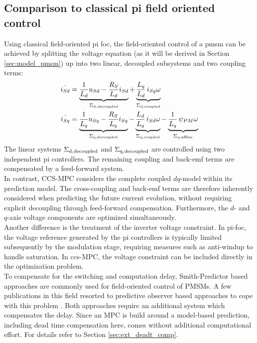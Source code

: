 \subsection{Comparison to classical \acrshort{pi} field oriented control \label{sec:intro_comp_cs}}
Using classical field-oriented \acrshort{pi} \acrshort{foc}, the field-oriented control of a \acrshort{pmsm} can be achieved by splitting the voltage equation (as it will be derived in Section \ref{sec:model_pmsm}) up into two linear, decoupled subsystems and two coupling terms:
\begin{align*}
	\Dot{i_{Sd}}
	&=
	\underbrace{
		\frac{1}{L_d} u_{Sd} - \frac{R_S}{L_d} i_{Sd}
	}_{\Sigma_{\mathrm{d,decoupled}}}
	+
	\underbrace{
		\frac{L_q}{L_d} \, i_{Sq}  \omega 
	}_{\Sigma_{\mathrm{d,coupled}}}
	\\
	\Dot{i_{Sq}}
	&=
	\underbrace{
		\frac{1}{L_q} u_{Sq} - \frac{R_S}{L_q} i_{Sq}
	}_{\Sigma_{\mathrm{q,decoupled}}}
	-
	\underbrace{
		\frac{L_d}{L_q} \,  i_{Sd} \omega
	}_{\Sigma_{\mathrm{q,coupled}}}
	-
	\underbrace{
		\frac{1}{L_q} \, \psi_{PM} \omega 
	}_{\Sigma_{\mathrm{q,affine}}}
\end{align*}
The linear systems $\Sigma_{\mathrm{d,decoupled}}$ and $\Sigma_{\mathrm{q,decoupled}}$ are controlled using two independent \acrshort{pi} controllers. The remaining coupling and back-\acrshort{emf} terms are compensated by a feed-forward system.\\
In contrast, CCS-MPC considers the complete coupled $dq$-model within its prediction model. The cross-coupling and back-\acrshort{emf} terms are therefore inherently considered when predicting the future current evolution, without requiring explicit decoupling through feed-forward compensation. Furthermore, the $d$- and $q$-axis voltage components are optimized simultaneously. \\
Another difference is the treatment of the inverter voltage constraint. In \acrshort{pi}-\acrshort{foc}, the voltage reference generated by the \acrshort{pi} controllers is typically limited subsequently by the modulation stage, requiring measures such as anti-windup to handle saturation. In \acrshort{ccs}-MPC, the voltage constraint can be included directly in the optimization problem.\\
To compensate for the switching and computation delay, Smith-Predictor based approaches are commonly used for field-oriented control of PMSMs. A few publications in this field resorted to predictive observer based approaches to cope with this problem \cite{XuchenPMSMiObs}. Both approaches require an additional system which compensates the delay. Since an MPC is build around a model-based prediction, including dead time compensation here, comes without additional computational effort. For details refer to Section \ref{sec:ext_deadt_comp}.